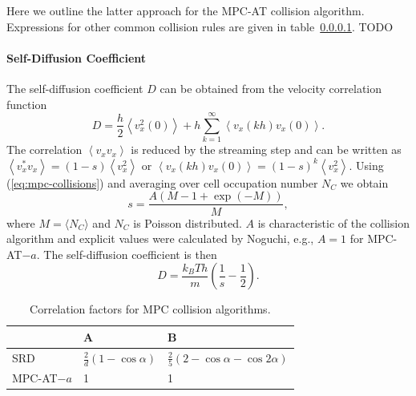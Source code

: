 \documentclass[8.5pt,twoside,twocolumn]{article}
\begin{document}
Here we outline the latter approach for the MPC-AT collision algorithm. Expressions for other common collision rules are given in table~\ref{}. TODO

\paragraph{Self-Diffusion Coefficient}

The self-diffusion coefficient $D$ can be obtained from  the velocity correlation function
%
\begin{equation}
D= \frac{h}{2} \left\langle v_x^2(0) \right\rangle + h \sum_{k=1}^{\infty} \left\langle v_x(kh) v_x(0) \right\rangle .
\end{equation}
%
The correlation $\left\langle v_x v_x \right\rangle$ is reduced by the streaming step and can be written as $\left\langle v_x^* v_x \right\rangle = (1-s) \left\langle v_x^2 \right\rangle$ or $\left\langle v_x(kh) v_x(0) \right\rangle=(1-s)^k \left\langle v_x^2 \right\rangle$.
%
%
%
%
Using (\ref{eq:mpc-collisions}) and averaging over cell occupation number $N_C$ we obtain
%
\begin{equation}
s = \frac{A\left(M-1+\exp(-M)\right)}{M} ,
\end{equation}
%
where $M=\langle N_C \rangle$ and $N_C$ is Poisson distributed. $A$ is characteristic of the collision algorithm and explicit values were calculated by Noguchi\cite{Noguchi:2008}, e.g., $A=1$ for MPC-AT$-a$. The self-diffusion coefficient is then
%
\begin{equation}
  D %
  = \frac{k_B T h}{m} \left( \frac{1}{s} - \frac{1}{2} \right) .
\end{equation}

\begin{table}\centering
\begin{tabular}{l|l|l}
  \hline
  & A & B \\
  \hline
  SRD & $\frac{2}{d}(1-\cos\alpha)$ & $\frac{2}{5}(2-\cos\alpha-\cos2\alpha)$ \\
  MPC-AT$-a$ & 1 & 1 \\
  \hline
\end{tabular}
\caption{Correlation factors for MPC collision algorithms.}
\label{tab:mpc-correlation-factors}
\end{table}
\end{document}
